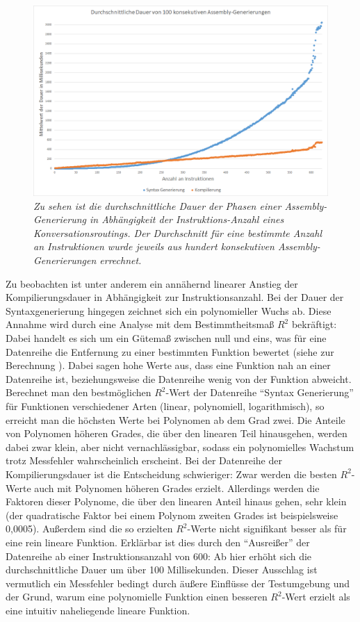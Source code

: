 \begin{figure} %
	\centering
		\includegraphics[width=\textwidth]{img/AverageTimeDiagram2.png}
	\caption[Durchschnittliche Dauer von Assembly-Generierungen]{\textit{Zu sehen ist die durchschnittliche Dauer der Phasen einer Assembly-Generierung in Abhängigkeit der Instruktions-Anzahl eines Konversationsroutings. Der Durchschnitt für eine bestimmte Anzahl an Instruktionen wurde jeweils aus hundert konsekutiven Assembly-Generierungen errechnet.}}
	\label{fig:AverageTimeDiagram}
\end{figure}
\noindent Zu beobachten ist unter anderem ein annähernd linearer Anstieg der Kompilierungsdauer in Abhängigkeit zur Instruktionsanzahl. Bei der Dauer der Syntaxgenerierung hingegen zeichnet sich ein polynomieller Wuchs ab. Diese Annahme wird durch eine Analyse mit dem Bestimmtheitsmaß $R^{2}$ bekräftigt: Dabei handelt es sich um ein Gütemaß zwischen null und eins, was für eine Datenreihe die Entfernung zu einer bestimmten Funktion bewertet (siehe zur Berechnung \cite{Pflieger:14}). Dabei sagen hohe Werte aus, dass eine Funktion nah an einer Datenreihe ist, beziehungsweise die Datenreihe wenig von der Funktion abweicht. Berechnet man den bestmöglichen $R^{2}$-Wert der Datenreihe ``Syntax Generierung'' für Funktionen verschiedener Arten (linear, polynomiell, logarithmisch), so erreicht man die höchsten Werte bei Polynomen ab dem Grad zwei. Die Anteile von Polynomen höheren Grades, die über den linearen Teil hinausgehen, werden dabei zwar klein, aber nicht vernachlässigbar, sodass ein polynomielles Wachstum trotz Messfehler wahrscheinlich erscheint. 
\newline
Bei der Datenreihe der Kompilierungsdauer ist die Entscheidung schwieriger: Zwar werden die besten $R^{2}$-Werte auch mit Polynomen höheren Grades erzielt. Allerdings werden die Faktoren dieser Polynome, die über den linearen Anteil hinaus gehen, sehr klein (der quadratische Faktor bei einem Polynom zweiten Grades ist beispielsweise 0,0005). Außerdem sind die so erzielten $R^{2}$-Werte nicht signifikant besser als für eine rein lineare Funktion. Erklärbar ist dies durch den ``Ausreißer'' der Datenreihe ab einer Instruktionsanzahl von 600: Ab hier erhöht sich die durchschnittliche Dauer um über 100 Millisekunden. Dieser Ausschlag ist vermutlich ein Messfehler bedingt durch äußere Einflüsse der Testumgebung und der Grund, warum eine polynomielle Funktion einen besseren $R^{2}$-Wert erzielt als eine intuitiv naheliegende lineare Funktion.
